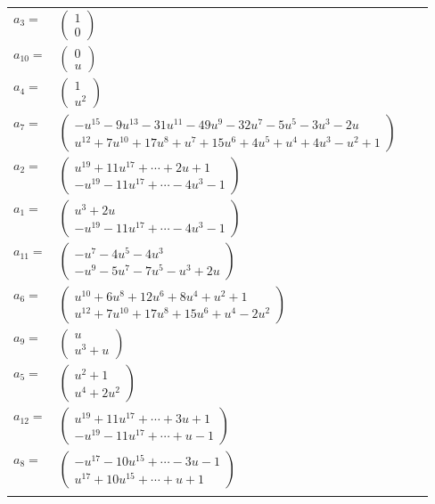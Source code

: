 \documentclass[1p]{elsarticle_modified}
\theoremstyle{definition}
\begin{document}
\begin{tabular}{m{7pt} m{180pt} m{7pt} m{180pt} }
\flushright $a_{3}=$&$\begin{pmatrix}1\\0\end{pmatrix}$ \\
\flushright $a_{10}=$&$\begin{pmatrix}0\\u\end{pmatrix}$ \\
\flushright $a_{4}=$&$\begin{pmatrix}1\\u^2\end{pmatrix}$ \\
\flushright $a_{7}=$&$\begin{pmatrix}- u^{15}-9 u^{13}-31 u^{11}-49 u^9-32 u^7-5 u^5-3 u^3-2 u\\u^{12}+7 u^{10}+17 u^8+u^7+15 u^6+4 u^5+u^4+4 u^3- u^2+1\end{pmatrix}$ \\
\flushright $a_{2}=$&$\begin{pmatrix}u^{19}+11 u^{17}+\cdots+2 u+1\\- u^{19}-11 u^{17}+\cdots-4 u^3-1\end{pmatrix}$ \\
\flushright $a_{1}=$&$\begin{pmatrix}u^3+2 u\\- u^{19}-11 u^{17}+\cdots-4 u^3-1\end{pmatrix}$ \\
\flushright $a_{11}=$&$\begin{pmatrix}- u^7-4 u^5-4 u^3\\- u^9-5 u^7-7 u^5- u^3+2 u\end{pmatrix}$ \\
\flushright $a_{6}=$&$\begin{pmatrix}u^{10}+6 u^8+12 u^6+8 u^4+u^2+1\\u^{12}+7 u^{10}+17 u^8+15 u^6+u^4-2 u^2\end{pmatrix}$ \\
\flushright $a_{9}=$&$\begin{pmatrix}u\\u^3+u\end{pmatrix}$ \\
\flushright $a_{5}=$&$\begin{pmatrix}u^2+1\\u^4+2 u^2\end{pmatrix}$ \\
\flushright $a_{12}=$&$\begin{pmatrix}u^{19}+11 u^{17}+\cdots+3 u+1\\- u^{19}-11 u^{17}+\cdots+u-1\end{pmatrix}$ \\
\flushright $a_{8}=$&$\begin{pmatrix}- u^{17}-10 u^{15}+\cdots-3 u-1\\u^{17}+10 u^{15}+\cdots+u+1\end{pmatrix}$\\&\end{tabular}
\end{document}

